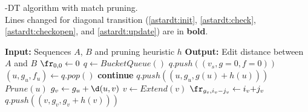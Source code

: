 \begin{algorithm}[b]
  \caption{
    \A-DT algorithm with match pruning.\\
    Lines changed for diagonal transition
    (\ref{astardt:init}, \ref{astardt:check}, \ref{astardt:checkopen}, and
    \ref{astardt:update})
    are in \textbf{bold}.
  }%
  \label{alg:astardt}
\fontfamily{\sfdefault}\selectfont
\begin{algorithmic}[1]
\State \textbf{Input:} Sequences $A$, $B$ and
pruning heuristic $h$
\State \textbf{Output:} Edit distance between $A$ and $B$
\boldnext
\State $\fr_{0,0} \gets 0$
\label{astardt:init}
\State $q \gets BucketQueue()$
\State $q.push((v_s, g{=}0, f{=}0))$
\Repeat
  \State $(u, g_u, f_u) \gets q.pop()$
\boldnext
    \label{astardt:check}
    \State \textbf{continue}
    \State $q.push((u, g_u, g(u) + h(u)))$
  \Else
  \State $Prune(u)$
     \State $g_v \gets g_u + \d(u, v)$
     \State $v \gets Extend(v)$
\boldnext
       \label{astardt:checkopen}
\boldnext
       \State $\fr_{g_v,i_v{-}j_v} \gets i_v{+}j_v$
       \label{astardt:update}
       \State $q.push((v, g_v, g_v + h(v)))$
     \EndIf
   \EndFor
   \EndIf
{}
\State {}
\EndFunction
\end{algorithmic}
\end{algorithm}
